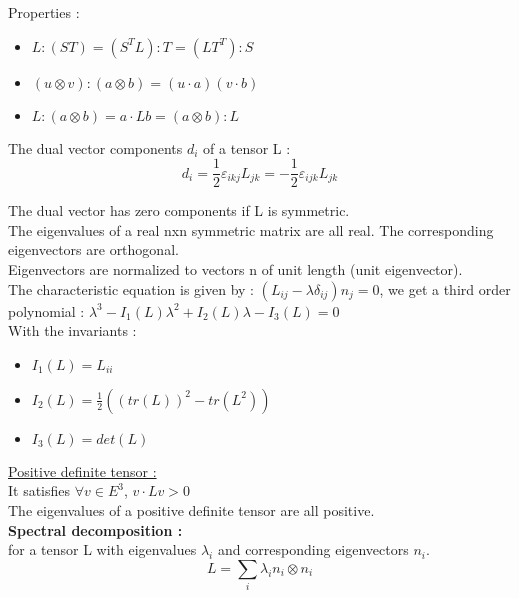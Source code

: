 \documentclass[../main.tex]{subfiles}
\begin{document}
Properties : \begin{itemize}
    \item $L:(ST) = (S^TL):T = (LT^T):S$\\
    \item $(u\otimes v) : (a\otimes b) = (u\cdot a)(v\cdot b)$\\
    \item $L:(a\otimes b) = a\cdot Lb = (a\otimes b):L$\\
\end{itemize}

The dual vector components $d_i$ of a tensor L : \begin{equation}
    d_i = \frac{1}{2} \varepsilon_{ikj}L_{jk} = -\frac{1}{2}\varepsilon_{ijk}L_{jk}
\end{equation}

The dual vector has zero components if L is symmetric. \\

The eigenvalues of a real nxn symmetric matrix are all real. The corresponding eigenvectors are orthogonal.\\
Eigenvectors are normalized to vectors n of unit length (unit eigenvector).\\

The characteristic equation is given by : $(L_{ij} - \lambda \delta_{ij})n_j = 0$, we get a third order polynomial : $\lambda^3 - I_1(L)\lambda^2 + I_2(L)\lambda - I_3(L) = 0$\\

With the invariants : \begin{itemize}
    \item $I_1(L) = L_{ii}$\\
    \item $I_2(L) = \frac{1}{2}((tr(L))^2 - tr(L^2))$\\
    \item $I_3(L) = det(L)$\\
\end{itemize}

\quad \underline{Positive definite tensor :}\\
It satisfies $\forall v\in E^3$, $v\cdot Lv>0$\\
The eigenvalues of a positive definite tensor are all positive. \\

\textbf{Spectral decomposition :} \\
for a tensor L with eigenvalues $\lambda_i$ and corresponding eigenvectors $n_i$. \begin{equation}
    L = \sum_i \lambda_i n_i\otimes n_i
\end{equation}
\end{document}
